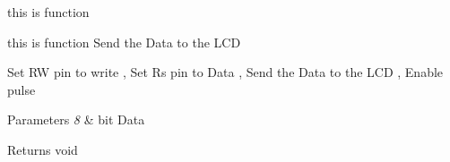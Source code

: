 this is function 

this is function Send the Data to the L\+CD

Set RW pin to write , Set Rs pin to Data , Send the Data to the L\+CD , Enable pulse


\begin{DoxyParams}{Parameters}
{\em 8} & bit Data\\
\hline
\end{DoxyParams}
\begin{DoxyReturn}{Returns}
void 
\end{DoxyReturn}
